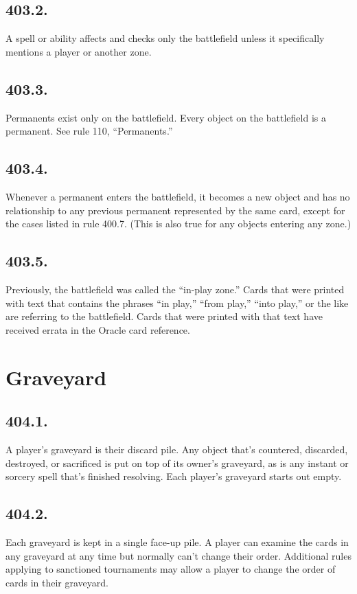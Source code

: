 \subsection*{403.2.}
A spell or ability affects and checks only the battlefield unless it specifically mentions a player or another zone.

\subsection*{403.3.}
Permanents exist only on the battlefield. Every object on the battlefield is a permanent. See rule 110, “Permanents.”

\subsection*{403.4.}
Whenever a permanent enters the battlefield, it becomes a new object and has no relationship to any previous permanent represented by the same card, except for the cases listed in rule 400.7. (This is also true for any objects entering any zone.)

\subsection*{403.5.}
Previously, the battlefield was called the “in-play zone.” Cards that were printed with text that contains the phrases “in play,” “from play,” “into play,” or the like are referring to the battlefield. Cards that were printed with that text have received errata in the Oracle card reference.

\section{Graveyard}
\subsection*{404.1.}
A player’s graveyard is their discard pile. Any object that’s countered, discarded, destroyed, or sacrificed is put on top of its owner’s graveyard, as is any instant or sorcery spell that’s finished resolving. Each player’s graveyard starts out empty.

\subsection*{404.2.}
Each graveyard is kept in a single face-up pile. A player can examine the cards in any graveyard at any time but normally can’t change their order. Additional rules applying to sanctioned tournaments may allow a player to change the order of cards in their graveyard.

